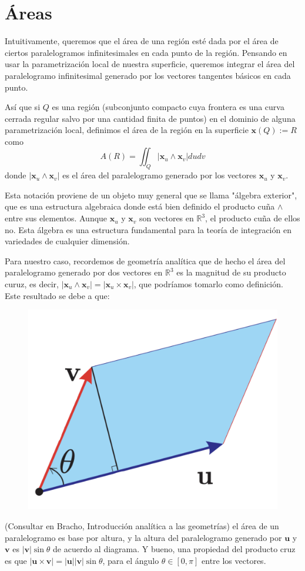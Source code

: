 \documentclass[spanish]{book}
\theoremstyle{definition}
\newcommand{\R}{\mathbb{R}}
\begin{document}
\section{Áreas}
Intuitivamente, queremos que el área de una región esté dada por el área de ciertos paralelogramos infinitesimales en cada punto de la región. Pensando en usar la parametrización local de nuestra superficie, queremos integrar el área del paralelogramo infinitesimal generado por los vectores tangentes básicos en cada punto.

Así que si $Q$ es una región (subconjunto compacto cuya frontera es una curva cerrada regular salvo por una cantidad finita de puntos) en el dominio de alguna parametrización local, definimos el área de la región en la superficie $\mathbf{x}(Q):=R$ como
\[A(R)=\iint_Q|\mathbf{x}_u\wedge\mathbf{x}_v|dudv\]
donde $|\mathbf{x}_u\wedge\mathbf{x}_v|$ es el área del paralelogramo generado por los vectores $\mathbf{x}_u$ y $\mathbf{x}_v$.

Esta notación proviene de un objeto muy general que se llama "álgebra exterior", que es una estructura algebraica donde está bien definido el producto cuña $\wedge$ entre sus elementos. Aunque $\mathbf{x}_u$ y $\mathbf{x}_v$ son vectores en $\R^3$, el producto cuña de ellos no. Esta álgebra es una estructura fundamental para la teoría de integración en variedades de cualquier dimensión.

Para nuestro caso, recordemos de geometría analítica que de hecho el área del paralelogramo generado por dos vectores en $\R^3$ es la magnitud de su producto curuz, es decir, $|\mathbf{x}_u\wedge\mathbf{x}_v|=|\mathbf{x}_u\times\mathbf{x}_v|$, que podríamos tomarlo como definición. Este resultado se debe a que:
\begin{figure}[H]
	\centering
	\includegraphics[width=0.4\linewidth]{sup7}
\end{figure}
(Consultar en Bracho, Introducción analítica a las geometrías) el área de un paralelogramo es base por altura, y la altura del paralelogramo generado por $\mathbf{u}$ y $\mathbf{v}$ es $|\mathbf{v}|\sin{\theta}$ de acuerdo al diagrama. Y bueno, una propiedad del producto cruz es que $|\mathbf{u}\times\mathbf{v}|=|\mathbf{u}||\mathbf{v}|\sin{\theta}$, para el ángulo $\theta\in[0,\pi]$ entre los vectores.
\end{document}
